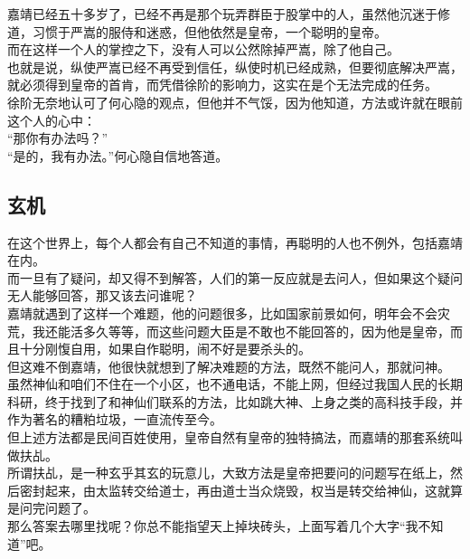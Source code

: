 \begin{multicols}{\theparacolNo}
嘉靖已经五十多岁了，已经不再是那个玩弄群臣于股掌中的人，虽然他沉迷于修道，习惯于严嵩的服侍和迷惑，但他依然是皇帝，一个聪明的皇帝。\\

而在这样一个人的掌控之下，没有人可以公然除掉严嵩，除了他自己。\\

也就是说，纵使严嵩已经不再受到信任，纵使时机已经成熟，但要彻底解决严嵩，就必须得到皇帝的首肯，而凭借徐阶的影响力，这实在是个无法完成的任务。\\

徐阶无奈地认可了何心隐的观点，但他并不气馁，因为他知道，方法或许就在眼前这个人的心中：\\

“那你有办法吗？”\\

“是的，我有办法。”何心隐自信地答道。\\

\subsection{玄机}
在这个世界上，每个人都会有自己不知道的事情，再聪明的人也不例外，包括嘉靖在内。\\

而一旦有了疑问，却又得不到解答，人们的第一反应就是去问人，但如果这个疑问无人能够回答，那又该去问谁呢？\\

嘉靖就遇到了这样一个难题，他的问题很多，比如国家前景如何，明年会不会灾荒，我还能活多久等等，而这些问题大臣是不敢也不能回答的，因为他是皇帝，而且十分刚愎自用，如果自作聪明，闹不好是要杀头的。\\

但这难不倒嘉靖，他很快就想到了解决难题的方法，既然不能问人，那就问神。\\

虽然神仙和咱们不住在一个小区，也不通电话，不能上网，但经过我国人民的长期科研，终于找到了和神仙们联系的方法，比如跳大神、上身之类的高科技手段，并作为著名的糟粕垃圾，一直流传至今。\\

但上述方法都是民间百姓使用，皇帝自然有皇帝的独特搞法，而嘉靖的那套系统叫做扶乩。\\

所谓扶乩，是一种玄乎其玄的玩意儿，大致方法是皇帝把要问的问题写在纸上，然后密封起来，由太监转交给道士，再由道士当众烧毁，权当是转交给神仙，这就算是问完问题了。\\

那么答案去哪里找呢？你总不能指望天上掉块砖头，上面写着几个大字“我不知道”吧。\\


\end{multicols}
